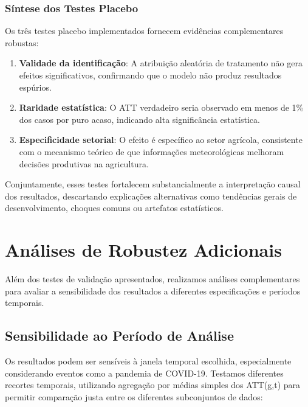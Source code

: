 \documentclass[
	12pt,				%
	oneside,			%
	a4paper,			%
	english,			%
	french,				%
	spanish,			%
	brazil				%
	]{abntex2}
\begin{document}
\subsubsection{Síntese dos Testes Placebo}

Os três testes placebo implementados fornecem evidências complementares robustas:

\begin{enumerate}
\item \textbf{Validade da identificação}: A atribuição aleatória de tratamento não gera efeitos significativos, confirmando que o modelo não produz resultados espúrios.

\item \textbf{Raridade estatística}: O ATT verdadeiro seria observado em menos de 1\% dos casos por puro acaso, indicando alta significância estatística.

\item \textbf{Especificidade setorial}: O efeito é específico ao setor agrícola, consistente com o mecanismo teórico de que informações meteorológicas melhoram decisões produtivas na agricultura.
\end{enumerate}

Conjuntamente, esses testes fortalecem substancialmente a interpretação causal dos resultados, descartando explicações alternativas como tendências gerais de desenvolvimento, choques comuns ou artefatos estatísticos.

\section{Análises de Robustez Adicionais}

Além dos testes de validação apresentados, realizamos análises complementares para avaliar a sensibilidade dos resultados a diferentes especificações e períodos temporais.

\FloatBarrier
\subsection{Sensibilidade ao Período de Análise}

Os resultados podem ser sensíveis à janela temporal escolhida, especialmente considerando eventos como a pandemia de COVID-19. Testamos diferentes recortes temporais, utilizando agregação por médias simples dos ATT(g,t) para permitir comparação justa entre os diferentes subconjuntos de dados:
\end{document}
